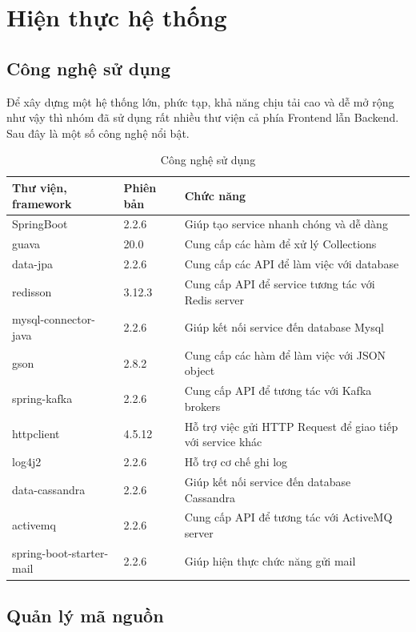 \chapter{Hiện thực hệ thống}

\section{Công nghệ sử dụng}

	Để xây dựng một hệ thống lớn, phức tạp, khả năng chịu tải cao và dễ mở rộng như vậy thì nhóm đã sử dụng rất nhiều thư viện cả phía Frontend lẫn Backend. Sau đây là một số công nghệ nổi bật.
	
	\begin{table}[!htp]
		\centering\begin{tabular}{|l|l|m{20em}|}
			\hline 
			Thư viện, framework & Phiên bản & Chức năng\\
			\hline 
			SpringBoot & 2.2.6 & Giúp tạo service nhanh chóng và dễ dàng  \\
			\hline 
			guava & 20.0 & Cung cấp các hàm để xử lý Collections \\
			\hline 
			data-jpa & 2.2.6 & Cung cấp các API để làm việc với database \\
			\hline 
			redisson & 3.12.3 & Cung cấp API để service tương tác với Redis server\\
			\hline 
			mysql-connector-java & 2.2.6 & Giúp kết nối service đến database Mysql \\
			\hline 
			gson & 2.8.2 & Cung cấp các hàm để làm việc với JSON object \\
			\hline 
			spring-kafka &  2.2.6 & Cung cấp API để tương tác với Kafka brokers \\
			\hline 
			httpclient & 4.5.12 & Hỗ trợ việc gửi HTTP Request để giao tiếp với service khác \\
			\hline 
			log4j2 &  2.2.6 & Hỗ trợ cơ chế ghi log \\
			\hline 
			data-cassandra & 2.2.6 & Giúp kết nối service đến database Cassandra \\
			\hline 
			activemq & 2.2.6  & Cung cấp API để tương tác với ActiveMQ server \\
			\hline 
			spring-boot-starter-mail & 2.2.6 & Giúp hiện thực chức năng gửi mail \\
			\hline
		\end{tabular}
		\caption{Công nghệ sử dụng}
	\end{table}


\section{Quản lý mã nguồn}
	
